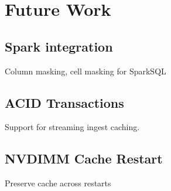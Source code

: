\section{Future Work}

\subsection{Spark integration}

Column masking, cell masking for SparkSQL

\subsection{ACID Transactions}

Support for streaming ingest caching.

\subsection{NVDIMM Cache Restart}

Preserve cache across restarts

